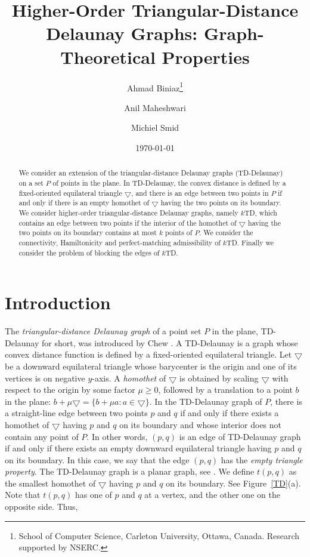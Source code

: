 \documentclass[11pt,a4paper]{article}
\title{Higher-Order Triangular-Distance Delaunay Graphs: Graph-Theoretical Properties}
\author{
Ahmad Biniaz\thanks{School of Computer Science, Carleton University, 
                    Ottawa, Canada. Research supported by NSERC.}
\and 
Anil Maheshwari\footnotemark[1]
\and 
Michiel Smid\footnotemark[1]
}
\date{\today}
\newcommand{\ConvexShape}{\bigtriangledown}
\newcommand{\kTD}[2]{$#1$\text{-}TD#2}
\begin{document}
\maketitle

\begin{abstract}
We consider an extension of the triangular-distance Delaunay graphs (TD-Delaunay) on a set $P$ of points in the plane. In TD-Delaunay, the convex distance is defined by a fixed-oriented equilateral triangle $\ConvexShape$, and there is an edge between two points in $P$ if and only if there is an empty homothet of $\ConvexShape$ having the two points on its boundary. We consider higher-order triangular-distance Delaunay graphs, namely \kTD{k}{}, which contains an edge between two points if the interior of the homothet of $\ConvexShape$ having the two points on its boundary contains at most $k$ points of $P$. We consider the connectivity, Hamiltonicity and perfect-matching admissibility of \kTD{k}{}. Finally we consider the problem of blocking the edges of \kTD{k}{}.
\end{abstract}

\section{Introduction}
The {\em triangular-distance Delaunay graph} of a point set $P$ in the plane, TD-Delaunay for short, was introduced by Chew \cite{Chew1989}. A TD-Delaunay is a graph whose convex distance function is defined by a fixed-oriented equilateral triangle. Let $\ConvexShape$ be a downward equilateral triangle whose barycenter
is the origin and one of its vertices is on negative $y$-axis. A {\em homothet} of $\ConvexShape$ is obtained by scaling $\ConvexShape$ with respect to the origin by some factor $\mu\ge 0$, followed by a translation to a point $b$ in the plane: $b+\mu\ConvexShape=\{b+\mu a:a\in\ConvexShape\}$.
In the TD-Delaunay graph of $P$, there is a straight-line edge between two points $p$ and $q$ if and only if there exists a homothet of $\ConvexShape$ having $p$ and $q$ on its boundary and whose interior does not contain any point of $P$. In other words, $(p,q)$ is an edge of TD-Delaunay graph if and only if there exists an empty downward equilateral triangle having $p$ and $q$ on its boundary. In this case, we say that the edge $(p,q)$ has the {\em empty triangle property}. 
The TD-Delaunay graph is a planar graph, see \cite{Bose2010}.
We define $t(p,q)$ as the smallest homothet of $\ConvexShape$ having $p$ and $q$ on its boundary. See Figure~\ref{TD}(a). Note that $t(p,q)$ has one of $p$ and $q$ at a vertex, and the other one on the opposite side. Thus,
\end{document}
